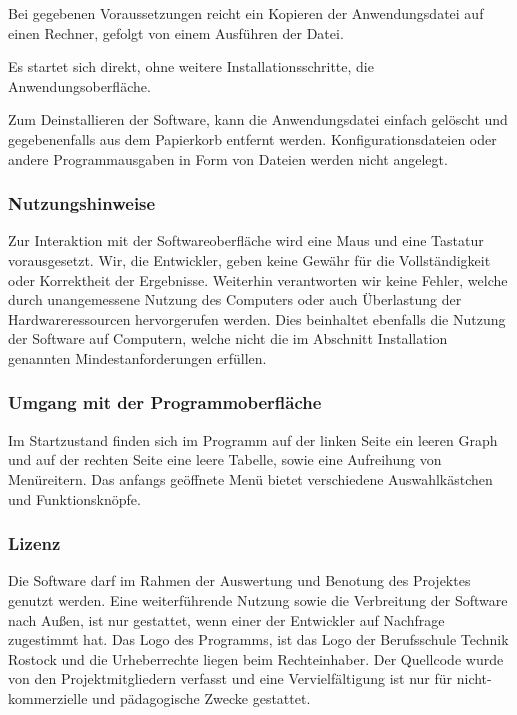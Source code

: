 \documentclass[a4paper]{article}
\begin{document}
    Bei gegebenen Voraussetzungen reicht ein Kopieren der Anwendungsdatei auf einen Rechner, gefolgt von einem Ausführen der Datei.

    Es startet sich direkt, ohne weitere Installationsschritte, die Anwendungsoberfläche.

    Zum Deinstallieren der Software, kann die Anwendungsdatei einfach gelöscht und gegebenenfalls aus dem Papierkorb entfernt werden.
    Konfigurationsdateien oder andere Programmausgaben in Form von Dateien werden nicht angelegt.

    \subsubsection{Nutzungshinweise}
    
    Zur Interaktion mit der Softwareoberfläche wird eine Maus und eine Tastatur vorausgesetzt.
    Wir, die Entwickler, geben keine Gewähr für die Vollständigkeit oder Korrektheit der Ergebnisse.
    Weiterhin verantworten wir keine Fehler, welche durch unangemessene Nutzung des Computers oder auch Überlastung der Hardwareressourcen hervorgerufen werden.
    Dies beinhaltet ebenfalls die Nutzung der Software auf Computern, welche nicht die im Abschnitt Installation genannten Mindestanforderungen erfüllen.

    \subsubsection{Umgang mit der Programmoberfläche}
    
    Im Startzustand finden sich im Programm auf der linken Seite ein leeren Graph und auf der rechten Seite eine leere Tabelle, sowie eine Aufreihung von Menüreitern.
    Das anfangs geöffnete Menü bietet verschiedene Auswahlkästchen und Funktionsknöpfe.
    
    \subsubsection{Lizenz}
    
    Die Software darf im Rahmen der Auswertung und Benotung des Projektes genutzt werden.
    Eine weiterführende Nutzung sowie die Verbreitung der Software nach Außen, ist nur gestattet, wenn einer der Entwickler auf Nachfrage zugestimmt hat.
    Das Logo des Programms, ist das Logo der Berufsschule Technik Rostock und die Urheberrechte liegen beim Rechteinhaber.
    Der Quellcode wurde von den Projektmitgliedern verfasst und eine Vervielfältigung ist nur für nicht-kommerzielle und  pädagogische Zwecke gestattet.
    
\end{document}
